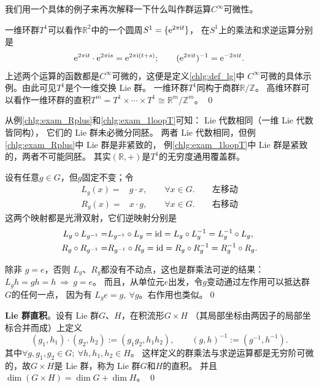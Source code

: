 我们用一个具体的例子来再次解释一下什么叫作群运算$C^\infty$可微性。
\begin{example}\label{chlg:exam_1loopT}
    一维环群$T^1$可以看作$\mathbb{R}^2$中的一个圆周$S^1=\{\mathrm{e}^{2\pi \mathrm{i} t} \}$，
    在$S^1$上的乘法和求逆运算分别是
    \begin{align*}
        \mathrm{e}^{2\pi \mathrm{i} t} \cdot \mathrm{e}^{2\pi \mathrm{i} s} = \mathrm{e}^{2\pi \mathrm{i} (t+s)}; \qquad
        (\mathrm{e}^{2\pi \mathrm{i} t})^{-1} = \mathrm{e}^{-2\pi \mathrm{i} t} .
    \end{align*}
    上述两个运算的函数都是$C^\infty$可微的，这便是定义\ref{chlg:def_lg}中
    $C^\infty$可微的具体示例。由此可见$T^1$是个一维交换 Lie 群。
    一维环群$T^1$同构于商群$\mathbb{R}/\mathbb{Z}$。
    高维环群可以看作一维环群的直积$T^m=T^1\times \cdots \times T^1 \cong \mathbb{R}^m/\mathbb{Z}^m$。
    \qed
\end{example}

从例\ref{chlg:exam_Rplus}和\ref{chlg:exam_1loopT}可知： Lie 代数相同（一维 Lie 代数皆同构），
它们的 Lie 群未必微分同胚。
两者 Lie 代数相同，但例\ref{chlg:exam_Rplus}中 Lie 群是非紧致的，
例\ref{chlg:exam_1loopT}中 Lie 群是紧致的，两者不可能同胚。
其实$(\mathbb{R},+)$是$T^1$的无穷度通用覆盖群。

\begin{example}
设有任意$g\in G$，但$g$固定不变；令
\begin{align}
    L_g(x)=& g\cdot x, \qquad \forall x \in G. \qquad {\textbf{左移动}} \\
    R_g(x)=& x\cdot g, \qquad \forall x \in G. \qquad {\textbf{右移动}}
\end{align}
这两个映射都是光滑双射，它们逆映射分别是
\begin{align}
    L_g \circ L_{g^{-1}} = & L_{g^{-1}} \circ L_g = \mathrm{id}  = L_g \circ L_{g}^{-1} = L_{g}^{-1} \circ L_g ,  \\
    R_g \circ R_{g^{-1}} = & R_{g^{-1}} \circ R_g = \mathrm{id}  = R_g \circ R_{g}^{-1} = R_{g}^{-1} \circ R_g .
\end{align}

除非 $g=e$，否则 $L_g$、$R_g$都没有不动点，这也是群乘法可逆的结果：
$L_g h = gh = h \ \Rightarrow \ g=e$。
而且，从单位元$e$出发，令$g$变动通过左作用可以抵达群$G$的任何一点，
因为有 $L_g e = g,\ \forall g$。右作用也类似。\qed
\end{example}

\begin{example}\label{chlg:exam_dir-prod}
    \textbf{Lie 群直积}。设有 Lie 群$G$、$H$，在积流形$G\times H$
    （其局部坐标由两因子的局部坐标合并而成）上定义
    \begin{equation}
        (g_1,h_1)\cdot(g_2,h_2):=(g_1 g_2, h_1h_2), \qquad
        (g,h)^{-1}:=(g^{-1},h^{-1}).
    \end{equation}
    其中$\forall g,g_1,g_2\in G;\ \forall h,h_1,h_2\in H$。
    这样定义的群乘法与求逆运算都是无穷阶可微的，故$G\times H$是 Lie 群，称为 Lie 群$G$和$H$的直积。
    并且$\dim (G\times H)=\dim G+\dim H$。 \qed
\end{example}

